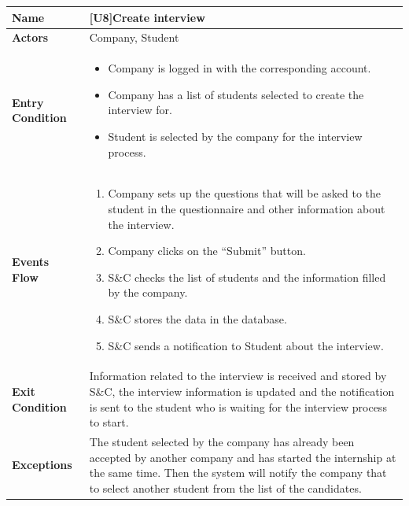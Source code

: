 \begin{center}
    \begin{tabular}{|p{9em}|p{27em}|}
        \hline
        \rowcolor{bluepoli!40} %
        \textbf{Name} & \textbf{[U8]Create interview} \\
        \hline
        \textbf{Actors} & Company, Student \\
        \hline
        \textbf{Entry Condition} & 
        \begin{itemize}
            \item Company is logged in with the corresponding account.
            \item Company has a list of students selected to create the interview for.
            \item Student is selected by the company for the interview process.
        \end{itemize} \\
        \hline
        \textbf{Events Flow} & 
        \begin{enumerate}
            \item Company sets up the questions that will be asked to the student in the questionnaire and other information about the interview.
            \item Company clicks on the ``Submit'' button.
            \item S\&C checks the list of students and the information filled by the company.
            \item S\&C stores the data in the database.
            \item S\&C sends a notification to Student about the interview.
        \end{enumerate} \\
        \hline
        \textbf{Exit Condition} & 
        Information related to the interview is received and stored by S\&C, the interview information is updated and the notification is 
        sent to the student who is waiting for the interview process to start.\\
        \hline
        \textbf{Exceptions} &
        The student selected by the company has already been accepted by another company and has started the internship at the same time.
        Then the system will notify the company that to select another student from the list of the candidates.\\
        \hline
    \end{tabular}
\end{center}

